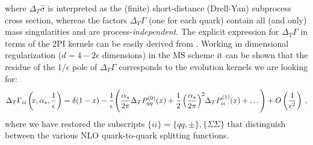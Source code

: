 where $\Delta_T \hat{\sigma}$ is interpreted as the (finite) short-distance
(Drell-Yan) subprocess cross section, whereas the factors $\Delta_T 
\Gamma$ (one for each quark) contain all (and only) mass singularities and 
are process-{\em independent}. The explicit expression for $\Delta_T \Gamma$
in terms of the 2PI kernels can be easily derived from \cite{cfp,ev}.
Working in dimensional regularization 
($d=4-2 \epsilon$ dimensions) in the $\overline{\mbox{MS}}$ scheme it 
can be shown \cite{cfp} that the residue of the $1/\epsilon$ pole of 
$\Delta_T \Gamma$ corresponds to the evolution kernels we are looking for:
\begin{equation}
\Delta_T \Gamma_{ii} \left( \hspace*{-0.08cm} 
x,\alpha_s,\frac{1}{\epsilon} \right) = \delta (1-x) - 
\frac{1}{\epsilon} \Bigg(\frac{\alpha_s}{2\pi} \Delta_T P_{qq}^{(0)}(x)
+\frac{1}{2} \left( \frac{\alpha_s}{2\pi} \right)^2 \hspace*{-0.08cm} 
\Delta_T P_{ii}^{(1)} (x) + \ldots \Bigg) + O \left(\frac{1}{\epsilon^2} 
\right) \: ,
\end{equation}
where we have restored the subscripts $\{ ii \} = \{ qq,\pm \}, \{\Sigma
\Sigma \}$ that distinguish between the various NLO quark-to-quark splitting
functions. 

